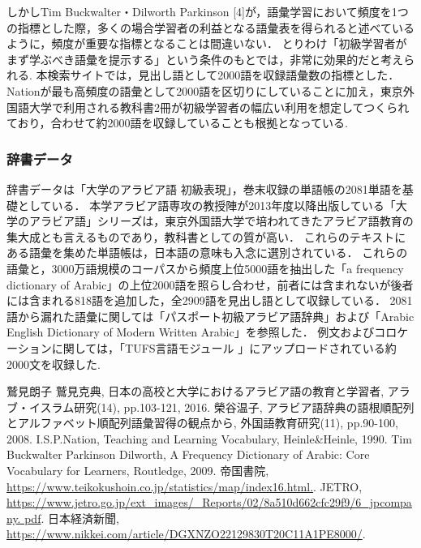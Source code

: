 \documentclass[technicalreport]{ieicej}
\begin{document}
しかしTim Buckwalter・Dilworth Parkinson [4]が，語彙学習において頻度を1つの指標とした際，多くの場合学習者の利益となる語彙表を得られると述べているように，頻度が重要な指標となることは間違いない．
とりわけ「初級学習者がまず学ぶべき語彙を提示する」という条件のもとでは，非常に効果的だと考えられる.
本検索サイトでは，見出し語として2000語を収録語彙数の指標とした．
Nationが最も高頻度の語彙として2000語を区切りにしていることに加え，東京外国語大学で利用される教科書2冊が初級学習者の幅広い利用を想定してつくられており，合わせて約2000語を収録していることも根拠となっている.
\subsubsection{辞書データ}
辞書データは「大学のアラビア語 初級表現」，巻末収録の単語帳の2081単語を基礎としている．
本学アラビア語専攻の教授陣が2013年度以降出版している「大学のアラビア語」シリーズは，東京外国語大学で培われてきたアラビア語教育の集大成とも言えるものであり，教科書としての質が高い．
これらのテキストにある語彙を集めた単語帳は，日本語の意味も入念に選別されている．
これらの語彙と，3000万語規模のコーパスから頻度上位5000語を抽出した「a frequency dictionary of Arabic」の上位2000語を照らし合わせ，前者には含まれないが後者には含まれる818語を追加した，全2909語を見出し語として収録している．
2081語から漏れた語彙に関しては「パスポート初級アラビア語辞典」および「Arabic English Dictionary of Modern Written Arabic」を参照した．
例文およびコロケーションに関しては，「TUFS言語モジュール 」にアップロードされている約2000文を収録した.
\begin{thebibliography}{99}
鷲見朗子 鷲見克典, 日本の高校と大学におけるアラビア語の教育と学習者, アラブ・イスラム研究(14), pp.103-121, 2016.
榮谷温子, アラビア語辞典の語根順配列とアルファベット順配列語彙習得の観点から, 外国語教育研究(11), pp.90-100, 2008.
I.S.P.Nation, Teaching and Learning Vocabulary, Heinle\&Heinle, 1990. 
Tim Buckwalter  Parkinson Dilworth, A Frequency Dictionary of Arabic: Core Vocabulary for Learners, Routledge, 2009.
帝国書院, \url{https://www.teikokushoin.co.jp/statistics/map/index16.html.}.
JETRO, \url{https://www.jetro.go.jp/ext_images/_Reports/02/8a510d662cfc29f9/6_jpcompany. pdf}.
日本経済新聞, \url{https://www.nikkei.com/article/DGXNZO22129830T20C11A1PE8000/}.
\end{thebibliography}
\end{document}
